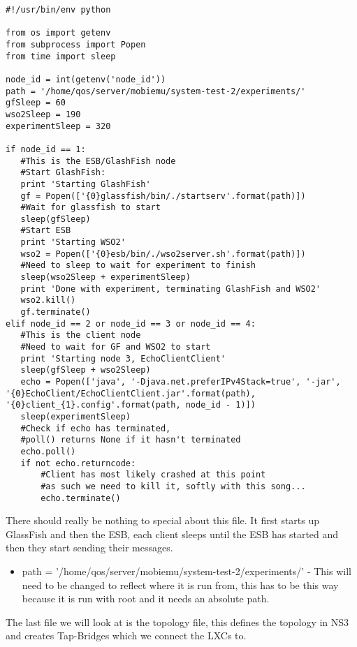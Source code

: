 \lstset{language=Python, style=eclipse}
\begin{lstlisting}[frame=single, caption={System-test-2.py}, label=mobiemu:system-test-2.py, breaklines=true]
#!/usr/bin/env python

from os import getenv
from subprocess import Popen
from time import sleep

node_id = int(getenv('node_id'))
path = '/home/qos/server/mobiemu/system-test-2/experiments/'
gfSleep = 60
wso2Sleep = 190
experimentSleep = 320

if node_id == 1:
   #This is the ESB/GlashFish node
   #Start GlashFish:
   print 'Starting GlashFish'
   gf = Popen(['{0}glassfish/bin/./startserv'.format(path)])
   #Wait for glassfish to start
   sleep(gfSleep)
   #Start ESB
   print 'Starting WSO2'
   wso2 = Popen(['{0}esb/bin/./wso2server.sh'.format(path)])
   #Need to sleep to wait for experiment to finish
   sleep(wso2Sleep + experimentSleep)    
   print 'Done with experiment, terminating GlashFish and WSO2'
   wso2.kill()
   gf.terminate()
elif node_id == 2 or node_id == 3 or node_id == 4:
   #This is the client node
   #Need to wait for GF and WSO2 to start
   print 'Starting node 3, EchoClientClient'
   sleep(gfSleep + wso2Sleep)
   echo = Popen(['java', '-Djava.net.preferIPv4Stack=true', '-jar', '{0}EchoClient/EchoClientClient.jar'.format(path), '{0}client_{1}.config'.format(path, node_id - 1)])
   sleep(experimentSleep)
   #Check if echo has terminated,
   #poll() returns None if it hasn't terminated
   echo.poll()
   if not echo.returncode:
       #Client has most likely crashed at this point
       #as such we need to kill it, softly with this song...
       echo.terminate()
\end{lstlisting}

There should really be nothing to special about this file. It first starts up GlassFish and then the ESB, each client sleeps until the ESB has started and then they start sending their messages.

\begin{itemize}\label{mobiemu:system-test-2.py changes}
\item path = '/home/qos/server/mobiemu/system-test-2/experiments/' - This will need to be changed to reflect where it is run from, this has to be this way because it is run with root and it needs an absolute path.
\end{itemize}

The last file we will look at is the topology file, this defines the topology in NS3 and creates Tap-Bridges which we connect the LXCs to.

